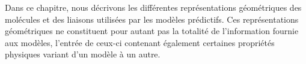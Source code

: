 \par Dans ce chapitre, nous décrivons les différentes représentations géométriques des molécules et des liaisons utilisées par les modèles prédictifs. Ces représentations géométriques ne constituent pour autant pas la totalité de l'information fournie aux modèles, l'entrée de ceux-ci contenant également certaines propriétés physiques variant d'un modèle à un autre.